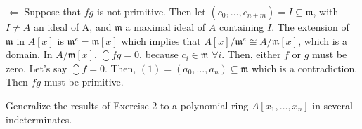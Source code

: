 \begin{sol}
\begin{enumerate}[label=(\roman*)]
	$\boxed{\Leftarrow}$ Suppose that $fg$ is not primitive. Then let $(c_0, \dots, c_{n+m}) = I \subseteq \mathfrak{m}$, with $I \neq A$ an ideal of A, and $\mathfrak{m}$ a maximal ideal of $A$ containing $I$. The extension of $\mathfrak{m}$ in $A[x]$ is $\mathfrak{m}^e = \mathfrak{m}[x]$ which implies that $A[x]/\mathfrak{m}^e \cong A/\mathfrak{m} [x]$, which is a domain. In $A/\mathfrak{m} [x]$, $\closure{fg} = 0$, because $c_i \in \mathfrak{m} \, \, \forall i$. Then, either $f$ or $g$ must be zero. Let's say $\closure{f} = 0$. Then, $(1) = (a_0, \dots, a_n) \subseteq \mathfrak{m}$ which is a contradiction. Then $fg$ must be primitive.

\end{enumerate}
\end{sol}

\begin{ex}
	Generalize the results of Exercise 2 to a polynomial ring $A[x_1, \dots, x_n]$ in several indeterminates.
\end{ex}

